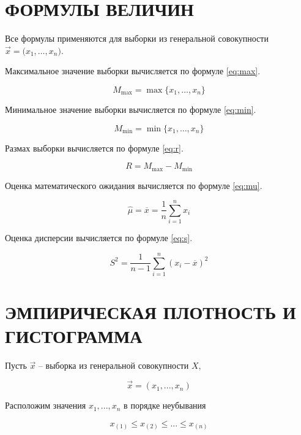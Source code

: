 \section{ФОРМУЛЫ ВЕЛИЧИН}

Все формулы применяются для выборки из генеральной совокупности
$\vec x = \big( x_1, \dots, x_n \big)$.

Максимальное значение выборки вычисляется по формуле \ref{eq:max}.

\begin{equation}\label{eq:max}
    M_{\max} = \max \{ x_1, \dots, x_n \}
\end{equation}

Минимальное значение выборки вычисляется по формуле \ref{eq:min}.

\begin{equation}\label{eq:min}
    M_{\min} = \min \{ x_1, \dots, x_n \}
\end{equation}

Размах выборки вычисляется по формуле \ref{eq:r}.

\begin{equation}\label{eq:r}
    R = M_{\max} - M_{\min}
\end{equation}

Оценка математического ожидания вычисляется по формуле \ref{eq:mu}.

\begin{equation}\label{eq:mu}
    \hat \mu = \overline x = \frac{1}{n} \sum_{i=1}^{n} x_i
\end{equation}

Оценка дисперсии вычисляется по формуле \ref{eq:s}.

\begin{equation}\label{eq:s}
    S^2 = \frac{1}{n-1} \sum_{i=1}^n (x_i - \overline{x})^2
\end{equation}

\section{ЭМПИРИЧЕСКАЯ ПЛОТНОСТЬ И ГИСТОГРАММА}

Пусть $\vec x$ -- выборка из генеральной совокупности $X$,

\begin{equation*}
    \vec x = (x_1, ..., x_n)
\end{equation*}

Расположим значения $x_1, ..., x_n$ в порядке неубывания

\begin{equation*}
    x_{(1)} \le x_{(2)} \le ... \le x_{(n)}
\end{equation*}

